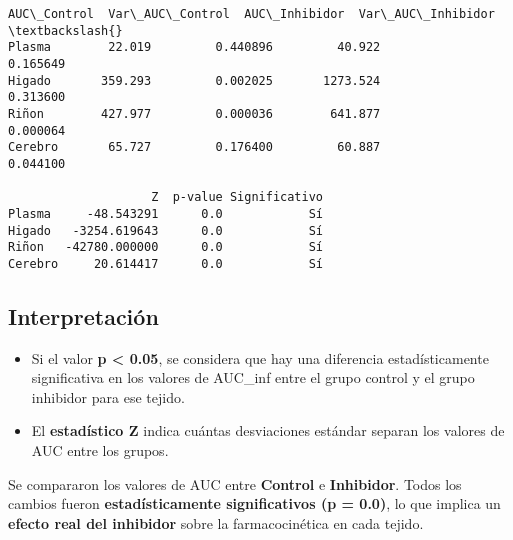 \documentclass[11pt]{article}
\providecommand{\tightlist}{%
      \setlength{\itemsep}{0pt}\setlength{\parskip}{0pt}}
\begin{document}
    \begin{Verbatim}[commandchars=\\\{\}]
         AUC\_Control  Var\_AUC\_Control  AUC\_Inhibidor  Var\_AUC\_Inhibidor  \textbackslash{}
Plasma        22.019         0.440896         40.922           0.165649
Higado       359.293         0.002025       1273.524           0.313600
Riñon        427.977         0.000036        641.877           0.000064
Cerebro       65.727         0.176400         60.887           0.044100

                    Z  p-value Significativo
Plasma     -48.543291      0.0            Sí
Higado   -3254.619643      0.0            Sí
Riñon   -42780.000000      0.0            Sí
Cerebro     20.614417      0.0            Sí
    \end{Verbatim}

    \subsection{Interpretación}\label{interpretaciuxf3n}

\begin{itemize}
\tightlist
\item
  Si el valor \textbf{p \textless{} 0.05}, se considera que hay una
  diferencia estadísticamente significativa en los valores de AUC\_inf
  entre el grupo control y el grupo inhibidor para ese tejido.
\item
  El \textbf{estadístico Z} indica cuántas desviaciones estándar separan
  los valores de AUC entre los grupos.
\end{itemize}

Se compararon los valores de AUC entre \textbf{Control} e
\textbf{Inhibidor}. Todos los cambios fueron \textbf{estadísticamente
significativos (p = 0.0)}, lo que implica un \textbf{efecto real del
inhibidor} sobre la farmacocinética en cada tejido.
\end{document}
